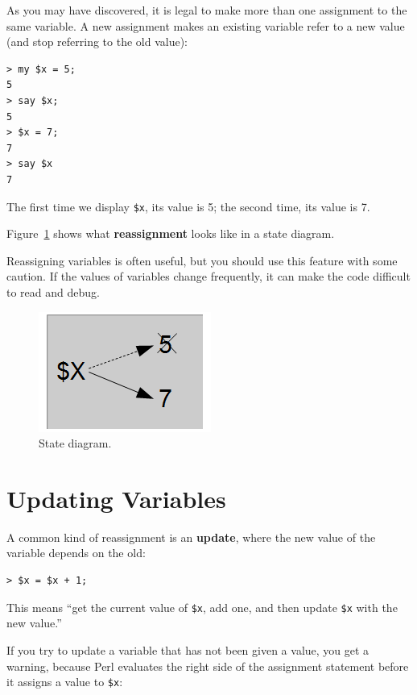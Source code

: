 As you may have discovered, it is legal to make more than one
assignment to the same variable.  A new assignment makes an existing
variable refer to a new value (and stop referring to the old value):

\begin{verbatim}
> my $x = 5;
5
> say $x;
5
> $x = 7;
7
> say $x
7
\end{verbatim}
%
The first time we display 
{\tt \$x}, its value is 5; the second time, its
value is 7.

Figure~\ref{fig.assign2} shows what {\bf reassignment} looks
like in a state diagram.  

Reassigning variables is often useful, but you should use this feature 
with some caution.  If the values of variables change frequently, it can
make the code difficult to read and debug.

\begin{figure}
\centerline
{\includegraphics[scale=0.5]{figs/reassignment.png}}
\caption{State diagram.}
\label{fig.assign2}
\end{figure}



\section{Updating Variables}
\label{update}


A common kind of reassignment is an {\bf update},
where the new value of the variable depends on the old:

\begin{verbatim}
> $x = $x + 1;
\end{verbatim}
%
This means ``get the current value of {\tt \$x}, add one, and then
update {\tt \$x} with the new value.''

If you try to update a variable that has not been given a value, 
you get a warning, because Perl evaluates the right side 
of the assignment statement before it assigns a value to {\tt \$x}:

